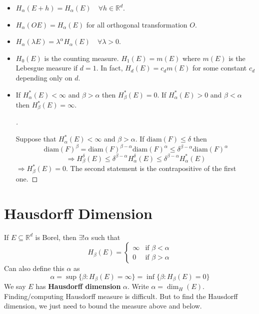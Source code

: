 \documentclass{article}
\theoremstyle{definition}
\newenvironment{proofs}[1][\proofname]{%
  \begin{proof}[#1]$ $\par\nobreak\ignorespaces
}{%
  \end{proof}
}
\newcommand{\RR}{\mathbb R}
\newcommand{\Ra}{\Rightarrow}
\newcommand{\diam}{\text{diam}}
\begin{document}
\begin{itemize}
	\item $H_\alpha(E + h) = H_\alpha(E) \quad \forall h \in \RR^d$.

	\item $H_\alpha(OE) = H_\alpha(E)$ for all orthogonal transformation $O$.

	\item $H_\alpha(\lambda E) = \lambda^\alpha H_\alpha(E) \quad \forall \lambda > 0$.

	\item $H_0(E)$ is the counting measure.
		$H_1(E) = m(E)$ where $m(E)$ is the Lebesgue measure if $d = 1$.
		In fact, $H_d(E) = c_d m(E)$ for some constant $c_d$ depending only on $d$.

	\item If $H_\alpha^*(E) < \infty$ and $\beta > \alpha$ then $H_\beta^*(E) = 0$.
		If $H_\alpha^*(E) > 0$ and $\beta < \alpha$ then $H_\beta^*(E) = \infty$.

		\begin{proofs}
			Suppose that $H_\alpha^*(E) < \infty$ and $\beta > \alpha$.
			If $\text{diam}(F) \leq \delta$ then 
			\[
				\diam(F)^\beta = \diam(F)^{\beta - \alpha} \diam(F)^\alpha \leq \delta^{\beta - \alpha} \diam(F)^\alpha
			\]
			\[
				\Ra H_\beta^\delta(E) \leq \delta^{\beta - \alpha} H_\alpha^\delta(E) \leq \delta^{\beta - \alpha} H_\alpha^*(E)
			\]
			$\Ra H_\beta^*(E) = 0$.
			The second statement is the contrapositive of the first one.
		\end{proofs}
\end{itemize}

\section{Hausdorff Dimension}

If $E \subseteq \RR^d$ is Borel, then $\exists ! \alpha$ such that
\[
	H_\beta(E) = 
	\begin{cases}
		\infty & \text{if } \beta < \alpha\\
		0 & \text{if } \beta > \alpha
	\end{cases}
\]
Can also define this $\alpha$ as
\[
	\alpha = \sup\{\beta: H_\beta(E) = \infty\} = \inf\{\beta: H_\beta(E) = 0\}
\]
We say $E$ has \textbf{Hausdorff dimension} $\alpha$.
Write $\alpha = \dim_H(E)$.
Finding/computing Hausdorff measure is difficult.
But to find the Hausdorff dimension, we just need to bound the measure above and below.
\end{document}
